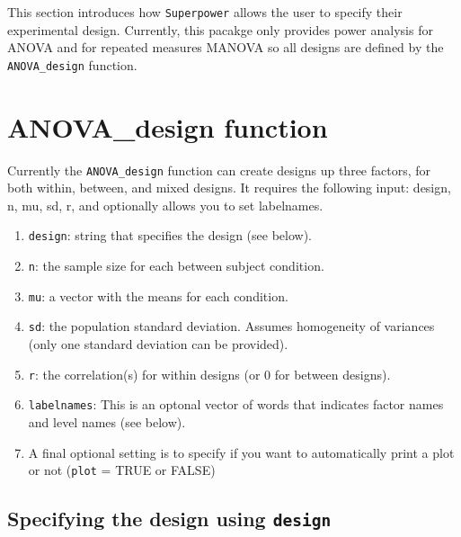 \documentclass[]{book}
\providecommand{\tightlist}{%
  \setlength{\itemsep}{0pt}\setlength{\parskip}{0pt}}
\begin{document}
This section introduces how \texttt{Superpower} allows the user to specify their experimental design.
Currently, this pacakge only provides power analysis for ANOVA and for repeated measures MANOVA so all designs are defined by the \texttt{ANOVA\_design} function.

\hypertarget{anova_design-function}{%
\section{ANOVA\_design function}\label{anova_design-function}}

Currently the \texttt{ANOVA\_design} function can create designs up three factors, for both within, between, and mixed designs. It requires the following input: design, n, mu, sd, r, and optionally allows you to set labelnames.

\begin{enumerate}
\def\labelenumi{\arabic{enumi}.}
\tightlist
\item
  \texttt{design}: string that specifies the design (see below).
\item
  \texttt{n}: the sample size for each between subject condition.
\item
  \texttt{mu}: a vector with the means for each condition.
\item
  \texttt{sd}: the population standard deviation. Assumes homogeneity of variances (only one standard deviation can be provided).
\item
  \texttt{r}: the correlation(s) for within designs (or 0 for between designs).
\item
  \texttt{labelnames}: This is an optonal vector of words that indicates factor names and level names (see below).
\item
  A final optional setting is to specify if you want to automatically print a plot or not (\texttt{plot} = TRUE or FALSE)
\end{enumerate}

\hypertarget{specifying-the-design-using-design}{%
\subsection{\texorpdfstring{Specifying the design using \texttt{design}}{Specifying the design using design}}\label{specifying-the-design-using-design}}
\end{document}
